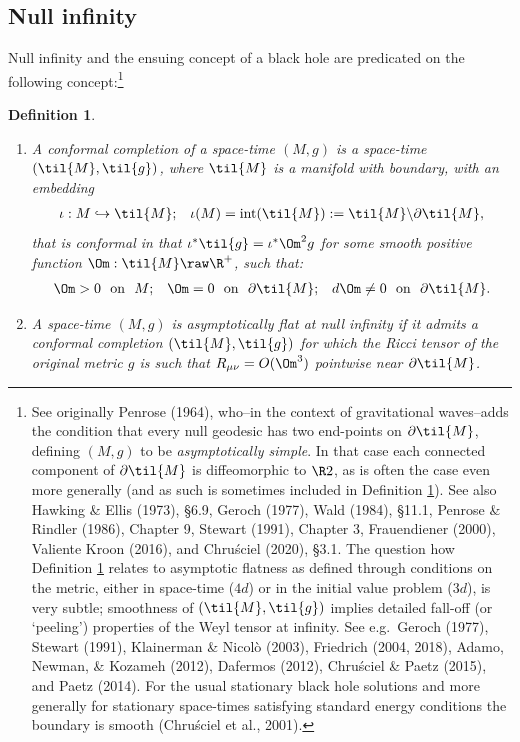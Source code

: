 \documentclass[12pt]{article}
\newcommand{\p}{\partial}
\newtheorem{definition}[theorem]{Definition}
\begin{document}
\subsection{Null infinity}\label{ni}
Null infinity and the ensuing concept  of a black hole are predicated on the following concept:\footnote{\label{fn14} See originally Penrose (1964), who--in the context of gravitational waves--adds the condition that every null geodesic has two end-points on $\p\til{M}$, defining $(M,g)$ to be \emph{asymptotically simple}. In that case each connected component of $\p\til{M}$ is  diffeomorphic to $\R\x S^2$, as is often the case even more generally (and as such is sometimes included in Definition \ref{defAF}).
 See also Hawking \& Ellis (1973),  \S 6.9, Geroch (1977), Wald (1984), \S 11.1, Penrose \& Rindler (1986), Chapter 9, Stewart (1991), Chapter 3, Frauendiener (2000),  
 Valiente Kroon (2016), and Chru\'{s}ciel (2020), \S 3.1.
 The question how Definition \ref{defAF} relates to asymptotic flatness as defined through conditions on the metric, either in space-time ($4d$) or in the initial value problem ($3d$), is very subtle; smoothness of $(\til{M},\til{g})$ implies detailed fall-off (or `peeling') properties of the Weyl tensor at infinity. See e.g.\ 
  Geroch (1977),  Stewart (1991), Klainerman \& Nicol\`{o} (2003),  Friedrich (2004, 2018),
   Adamo, Newman, \& Kozameh (2012),  Dafermos (2012),  Chru\'{s}ciel \&  Paetz (2015), and Paetz (2014).
 For the usual  stationary black hole solutions  and more generally for stationary space-times satisfying standard energy conditions the boundary is smooth (Chru\'{s}ciel et al., 2001). }
\begin{definition}\label{defAF}
\begin{enumerate}
\item 
A \emph{conformal completion} of a  space-time $(M,g)$  is a  space-time $(\til{M},\til{g})$, where  $\til{M}$ is a
manifold with boundary,
 with an embedding 
 \begin{align}
 \iota:M\hookrightarrow \til{M}; &&\iota(M)=\mathrm{int}(\til{M}):=\til{M}\backslash \p\til{M},
 \end{align}
 that is \emph{conformal} in that $\iota^*\til{g}=\iota^*\Om^2g$ for some smooth positive function
  $\Om:\til{M}\raw\R^+$, such that:
    \begin{align}
\Om>0\:\:\: \mathrm{ on }\:\:\:  M; &&  \Om=0 \:\:\:\mathrm{ on } \:\:\:\p \til{M}; && d\Om\neq 0 \:\:\: \mathrm{ on } \:\:\:\p \til{M}.
\label{Om3}
\end{align}
\item  A space-time $(M,g)$ is \emph{asymptotically flat at null infinity} if it admits a conformal completion $(\til{M},\til{g})$ for which  the Ricci tensor of the original metric $g$ is such that $R_{\mu\nu}=O(\Om^3)$ pointwise near $\p\til{M}$.
\end{enumerate}
 \end{definition}
\end{document}
